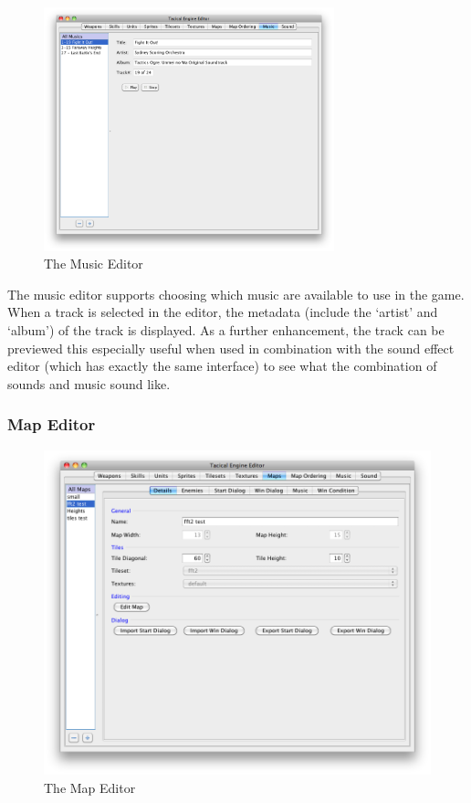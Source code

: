 \begin{figure}[htb]
	\centering
		\includegraphics[width=0.75\textwidth]{figures/editor/Music.png}
	\caption{The Music Editor}
	\label{fig:figures_editor_Music}
\end{figure}
The music editor supports choosing which music are available to use in the game.  When a track is selected in the editor, the metadata (include the `artist' and `album') of the track is displayed.  As a further enhancement, the track can be previewed this especially useful when used in combination with the sound effect editor (which has exactly the same interface) to see what the combination of sounds and music sound like. 

\clearpage

\subsubsection{Map Editor}

\begin{figure}[htbp]
	\centering
		\includegraphics[width=.9\textwidth]{figures/editor/maps.png}
	\caption{The Map Editor}
	\label{fig:figures_editor_maps}
\end{figure}

